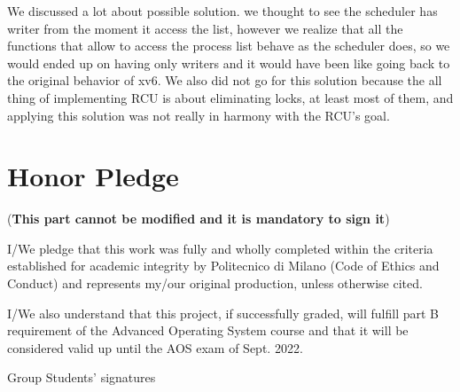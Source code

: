 \documentclass[10pt,a4]{article}
\begin{document}
We discussed a lot about possible solution. we thought to see the scheduler has writer from the moment it access the list, however we realize that all the functions that allow to access the process list behave as the scheduler does, so we would ended up on having only writers and it would have been like going back to the original behavior of xv6. We also did not go for this solution because the all thing of implementing RCU is about eliminating locks, at least most of them, and applying this solution was not really in harmony with the RCU's goal.

\section{Honor Pledge}
(\textbf{This part cannot be modified and it is mandatory to sign it})

I/We pledge that this work was fully and wholly completed within the criteria
established for academic integrity by Politecnico di Milano (Code of Ethics and
Conduct) and represents my/our original production, unless otherwise cited.

I/We also understand that this project, if successfully graded,  will fulfill part B requirement of the
Advanced Operating System course and that it will be considered valid up until
the AOS exam of Sept. 2022.

\begin{flushright}
Group Students' signatures
\end{flushright}
\end{document}
